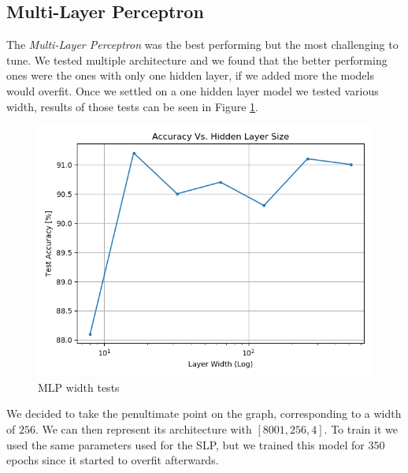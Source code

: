 \documentclass[10pt,a4paper]{report}
\begin{document}
\subsection{Multi-Layer Perceptron}
The \textit{Multi-Layer Perceptron} was the best performing but the most challenging to tune. We tested multiple architecture and we found that the better performing ones were the ones with only one hidden layer, if we added more the models would overfit. Once we settled on a one hidden layer model we tested various width, results of those tests can be seen in Figure \ref{fig:mlp_test}.
\begin{figure}[!ht]
\centering
\includegraphics[width=0.5\linewidth]{mlp_tests.png}
\caption{MLP width tests}
\label{fig:mlp_test}
\end{figure}
We decided to take the penultimate point on the graph, corresponding to a width of $256$. We can then represent its architecture with $[8001, 256, 4]$. To train it we used the same parameters used for the SLP, but we trained this model for $350$ epochs since it started to overfit afterwards. 
\end{document}
